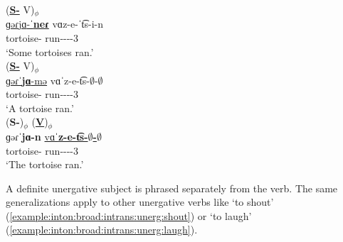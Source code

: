 \begin{exe}
	\ex \begin{xlist}
		\ex \glll (\textbf{\underline{S-{\pl}}} V)$_\phi$ \\
		\underline{{ɡəɾ{jɑ}-ˈ\textbf{neɾ}}}  vɑz-e-ˈt͡s-i-n \\
		tortoise-{\pl} run-{\thgloss}-{\aorperf}-{\pst}-3{\pl} \\
		\trans `Some tortoises ran.' \label{example:inton:broad:intrans:unerg:pl}
		\\ 
		\ex \glll (\textbf{\underline{S-{\indf}}} V)$_\phi$ \\
		\underline{{ɡəɾˈ\textbf{jɑ}-mə}}  vɑˈz-e-t͡s-$\emptyset$-$\emptyset$ \\ 
		tortoise-{\indf} run-{\thgloss}-{\aorperf}-{\pst}-3{\sg} \\
		\trans `A tortoise ran.'  \label{example:inton:broad:intrans:unerg:indf}
		\\ 
		\ex \glll (\textbf{{S-{}}})$_\phi$ (\textbf{\underline{V}})$_\phi$ \\
		{ɡəɾˈ\textbf{jɑ-n}}   \underline{vɑˈ\textbf{z-e-t͡s-$\emptyset$-$\emptyset$}} \\ 
		tortoise-{} run-{\thgloss}-{\aorperf}-{\pst}-3{\sg} \\
		\trans `The tortoise ran.' \label{example:inton:broad:intrans:unerg:def}
		\\ 
	\end{xlist}
\end{exe}

A definite unergative subject is phrased separately from the verb. The same generalizations apply to other unergative verbs like `to shout' (\ref{example:inton:broad:intrans:unerg:shout}) or `to laugh' (\ref{example:inton:broad:intrans:unerg:laugh}). 

